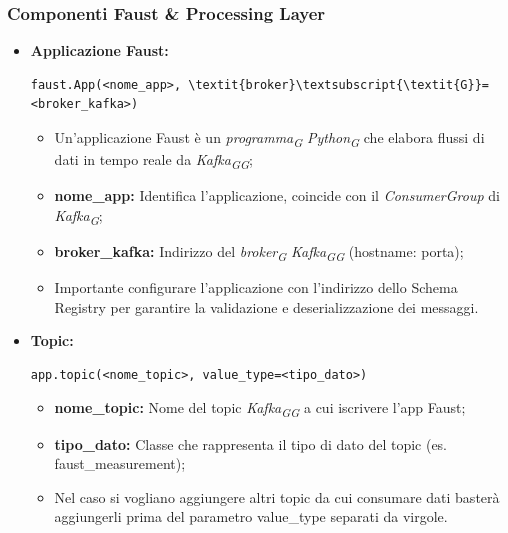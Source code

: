 \subsubsection{Componenti Faust \& Processing Layer}
\begin{itemize}
    \item \textbf{Applicazione Faust:}
    \begin{lstlisting}[style=code]
    faust.App(<nome_app>, \textit{broker}\textsubscript{\textit{G}}=<broker_kafka>)
    \end{lstlisting} 
    \begin{itemize}
        \item Un'applicazione Faust è un \textit{programma}\textsubscript{\textit{G}} \textit{Python}\textsubscript{\textit{G}} che elabora flussi di dati in tempo reale da \textit{Kafka}\textsubscript{\textit{G}}\textsubscript{\textit{G}};
        \item \textbf{nome\_app:} Identifica l'applicazione, coincide con il \textit{ConsumerGroup} di \textit{Kafka}\textsubscript{\textit{G}};
        \item \textbf{broker\_kafka:} Indirizzo del \textit{broker}\textsubscript{\textit{G}} \textit{Kafka}\textsubscript{\textit{G}}\textsubscript{\textit{G}} (hostname: porta);
        \item Importante configurare l'applicazione con l'indirizzo dello Schema Registry per garantire la validazione e deserializzazione dei messaggi.
    \end{itemize}

    \item \textbf{Topic:}
    \begin{lstlisting}[style=code]
    app.topic(<nome_topic>, value_type=<tipo_dato>)
    \end{lstlisting}  
    \begin{itemize}
        \item \textbf{nome\_topic:} Nome del topic \textit{Kafka}\textsubscript{\textit{G}}\textsubscript{\textit{G}} a cui iscrivere l'app Faust;
        \item \textbf{tipo\_dato:} Classe che rappresenta il tipo di dato del topic (es. faust\_measurement);
        \item Nel caso si vogliano aggiungere altri topic da cui consumare dati basterà aggiungerli prima del parametro value\_type separati da virgole.
    \end{itemize}


\end{itemize}
